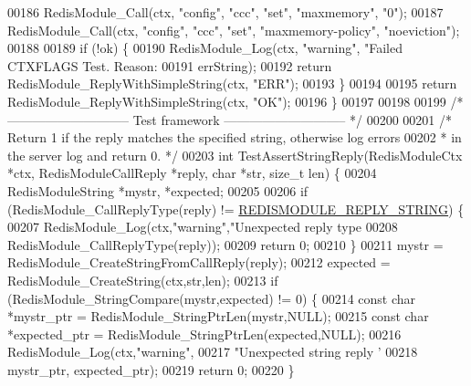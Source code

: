 \begin{DoxyCode}
{00186     RedisModule\_Call(ctx, \textcolor{stringliteral}{"config"}, \textcolor{stringliteral}{"ccc"}, \textcolor{stringliteral}{"set"}, \textcolor{stringliteral}{"maxmemory"}, \textcolor{stringliteral}{"0"});
00187     RedisModule\_Call(ctx, \textcolor{stringliteral}{"config"}, \textcolor{stringliteral}{"ccc"}, \textcolor{stringliteral}{"set"}, \textcolor{stringliteral}{"maxmemory-policy"}, \textcolor{stringliteral}{"noeviction"});
00188 
00189     \textcolor{keywordflow}{if} (!ok) \{
00190       RedisModule\_Log(ctx, \textcolor{stringliteral}{"warning"}, \textcolor{stringliteral}{"Failed CTXFLAGS Test. Reason: %
00191                       errString);
00192       \textcolor{keywordflow}{return} RedisModule\_ReplyWithSimpleString(ctx, \textcolor{stringliteral}{"ERR"});
00193     \}
00194 
00195     \textcolor{keywordflow}{return} RedisModule\_ReplyWithSimpleString(ctx, \textcolor{stringliteral}{"OK"});
00196   \}
00197 
00198 
00199 \textcolor{comment}{/* ----------------------------- Test framework ----------------------------- */}
00200 
00201 \textcolor{comment}{/* Return 1 if the reply matches the specified string, otherwise log errors}
00202 \textcolor{comment}{ * in the server log and return 0. */}
00203 \textcolor{keywordtype}{int} TestAssertStringReply(RedisModuleCtx *ctx, RedisModuleCallReply *reply, \textcolor{keywordtype}{char} *str, size\_t len) \{
00204     RedisModuleString *mystr, *expected;
00205 
00206     \textcolor{keywordflow}{if} (RedisModule\_CallReplyType(reply) != \hyperlink{redismodule_8h_abc8a4584f9085b55692994244a26012b}{REDISMODULE\_REPLY\_STRING}) \{
00207         RedisModule\_Log(ctx,\textcolor{stringliteral}{"warning"},\textcolor{stringliteral}{"Unexpected reply type %
00208             RedisModule\_CallReplyType(reply));
00209         \textcolor{keywordflow}{return} 0;
00210     \}
00211     mystr = RedisModule\_CreateStringFromCallReply(reply);
00212     expected = RedisModule\_CreateString(ctx,str,len);
00213     \textcolor{keywordflow}{if} (RedisModule\_StringCompare(mystr,expected) != 0) \{
00214         \textcolor{keyword}{const} \textcolor{keywordtype}{char} *mystr\_ptr = RedisModule\_StringPtrLen(mystr,NULL);
00215         \textcolor{keyword}{const} \textcolor{keywordtype}{char} *expected\_ptr = RedisModule\_StringPtrLen(expected,NULL);
00216         RedisModule\_Log(ctx,\textcolor{stringliteral}{"warning"},
00217             \textcolor{stringliteral}{"Unexpected string reply '%
00218             mystr\_ptr, expected\_ptr);
00219         \textcolor{keywordflow}{return} 0;
00220     \}
}}}}
\end{DoxyCode}

